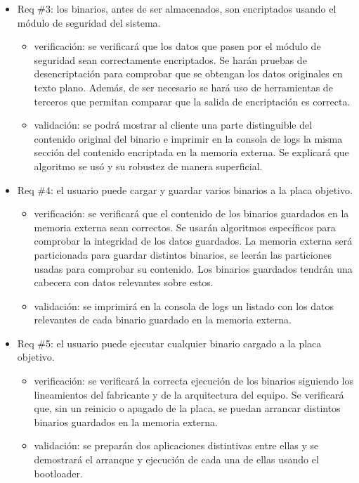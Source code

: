 \documentclass[
11pt, %
]{charter}
\begin{document}
\begin{itemize} 
\item Req \#3: los binarios, antes de ser almacenados, son encriptados usando el módulo de seguridad del sistema.

\begin{itemize}
	\item verificación: se verificará que los datos que pasen por el módulo de seguridad sean correctamente encriptados. Se harán pruebas de desencriptación para comprobar que se obtengan los datos originales en texto plano. Además, de ser necesario se hará uso de herramientas de terceros que permitan comparar que la salida de encriptación es correcta. 
	\item validación: se podrá mostrar al cliente una parte distinguible del contenido original del binario e imprimir en la consola de logs la misma sección del contenido encriptada en la memoria externa. Se explicará que algoritmo se usó y su robustez de manera superficial.
\end{itemize}

\end{itemize}

\begin{itemize} 
\item Req \#4: el usuario puede cargar y guardar varios binarios a la placa objetivo.

\begin{itemize}
	\item verificación: se verificará que el contenido de los binarios guardados en la memoria externa sean correctos. Se usarán algoritmos específicos para comprobar la integridad de los datos guardados. La memoria externa será particionada para guardar distintos binarios, se leerán las particiones usadas para comprobar su contenido. Los binarios guardados tendrán una cabecera con datos relevantes sobre estos. 
	\item validación: se imprimirá en la consola de logs un listado con los datos relevantes de cada binario guardado en la memoria externa.
\end{itemize}

\end{itemize}

\newpage

\begin{itemize} 
\item Req \#5: el usuario puede ejecutar cualquier binario cargado a la placa objetivo.

\begin{itemize}
	\item verificación: se verificará la correcta ejecución de los binarios siguiendo los lineamientos del fabricante y de la arquitectura del equipo. Se verificará que, sin un reinicio o apagado de la placa, se puedan arrancar distintos binarios guardados en la memoria externa. 
	\item validación: se preparán dos aplicaciones distintivas entre ellas y se demostrará el arranque y ejecución de cada una de ellas usando el bootloader.
\end{itemize}

\end{itemize}
\end{document}
